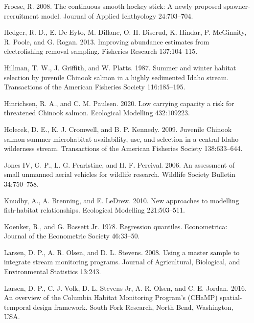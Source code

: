 \documentclass[
  12pt,
]{article}
\begin{document}
\leavevmode\hypertarget{ref-Froese2008}{}%
Froese, R. 2008. The continuous smooth hockey stick: A newly proposed spawner-recruitment model. Journal of Applied Ichthyology 24:703--704.

\leavevmode\hypertarget{ref-Hedger2013}{}%
Hedger, R. D., E. De Eyto, M. Dillane, O. H. Diserud, K. Hindar, P. McGinnity, R. Poole, and G. Rogan. 2013. Improving abundance estimates from electrofishing removal sampling. Fisheries Research 137:104--115.

\leavevmode\hypertarget{ref-Hillman1987}{}%
Hillman, T. W., J. Griffith, and W. Platts. 1987. Summer and winter habitat selection by juvenile Chinook salmon in a highly sedimented Idaho stream. Transactions of the American Fisheries Society 116:185--195.

\leavevmode\hypertarget{ref-Hinrichsen2020}{}%
Hinrichsen, R. A., and C. M. Paulsen. 2020. Low carrying capacity a risk for threatened Chinook salmon. Ecological Modelling 432:109223.

\leavevmode\hypertarget{ref-Holecek2009}{}%
Holecek, D. E., K. J. Cromwell, and B. P. Kennedy. 2009. Juvenile Chinook salmon summer microhabitat availability, use, and selection in a central Idaho wilderness stream. Transactions of the American Fisheries Society 138:633--644.

\leavevmode\hypertarget{ref-Jones2006}{}%
Jones IV, G. P., L. G. Pearlstine, and H. F. Percival. 2006. An assessment of small unmanned aerial vehicles for wildlife research. Wildlife Society Bulletin 34:750--758.

\leavevmode\hypertarget{ref-Knudby2010}{}%
Knudby, A., A. Brenning, and E. LeDrew. 2010. New approaches to modelling fish-habitat relationships. Ecological Modelling 221:503--511.

\leavevmode\hypertarget{ref-Koenker1978}{}%
Koenker, R., and G. Bassett Jr. 1978. Regression quantiles. Econometrica: Journal of the Econometric Society 46:33--50.

\leavevmode\hypertarget{ref-Larsen2008}{}%
Larsen, D. P., A. R. Olsen, and D. L. Stevens. 2008. Using a master sample to integrate stream monitoring programs. Journal of Agricultural, Biological, and Environmental Statistics 13:243.

\leavevmode\hypertarget{ref-Larsen2016}{}%
Larsen, D. P., C. J. Volk, D. L. Stevens Jr, A. R. Olsen, and C. E. Jordan. 2016. An overview of the Columbia Habitat Monitoring Program's (CHaMP) spatial-temporal design framework. South Fork Research, North Bend, Washington, USA.
\end{document}
